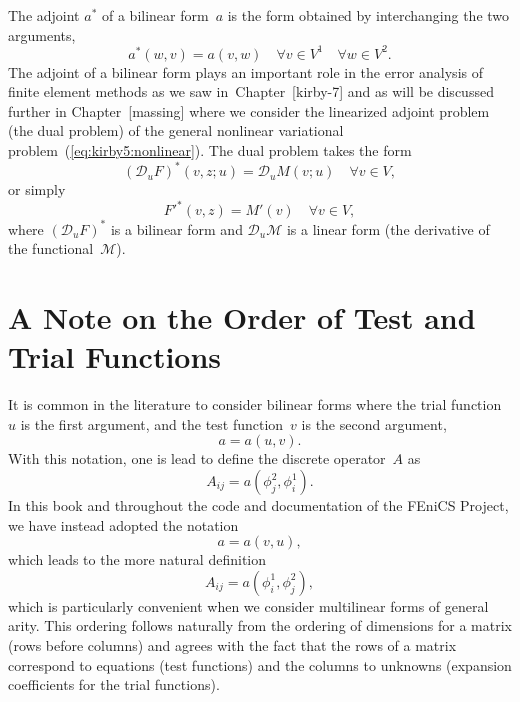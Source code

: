 The adjoint $a^*$ of a bilinear form~$a$ is the form obtained by
interchanging the two arguments,
\begin{displaymath}
  a^*(w, v) = a(v, w) \quad \forall v \in V^1 \quad \forall w \in V^2.
\end{displaymath}
The adjoint of a bilinear form plays an important role in the error
analysis of finite element methods as we saw in~Chapter~[kirby-7] and
as will be discussed further in Chapter~[massing] where we consider
the linearized adjoint problem (the dual problem) of the general
nonlinear variational problem~(\ref{eq:kirby5:nonlinear}). The dual
problem takes the form
\begin{displaymath}
  (\mathcal{D}_u F)^* (v, z; u) = \mathcal{D}_u M (v; u) \quad \forall v \in V,
\end{displaymath}
or simply
\begin{displaymath}
  F'^* (v, z) = M' (v) \quad \forall v \in V,
\end{displaymath}
where $(\mathcal{D}_u F)^*$ is a bilinear form and $\mathcal{D}_u
\mathcal{M}$ is a linear form (the derivative of the
functional~$\mathcal{M}$).

\section{A Note on the Order of Test and Trial Functions}

It is common in the literature to consider bilinear forms where the
trial function~$u$ is the first argument, and the test function~$v$ is
the second argument,
\begin{displaymath}
  a = a(u, v).
\end{displaymath}
With this notation, one is lead to define the discrete operator~$A$ as
\begin{displaymath}
  A_{ij} = a(\phi^2_j, \phi^1_i).
\end{displaymath}
In this book and throughout the code and documentation of the FEniCS
Project, we have instead adopted the notation
\begin{displaymath}
  a = a(v, u),
\end{displaymath}
which leads to the more natural definition
\begin{displaymath}
  A_{ij} = a(\phi^1_{i}, \phi^2_j),
\end{displaymath}
which is particularly convenient when we consider multilinear forms of
general arity. This ordering follows naturally from the ordering of
dimensions for a matrix (rows before columns) and agrees with the fact
that the rows of a matrix correspond to equations (test functions) and
the columns to unknowns (expansion coefficients for the trial
functions).
